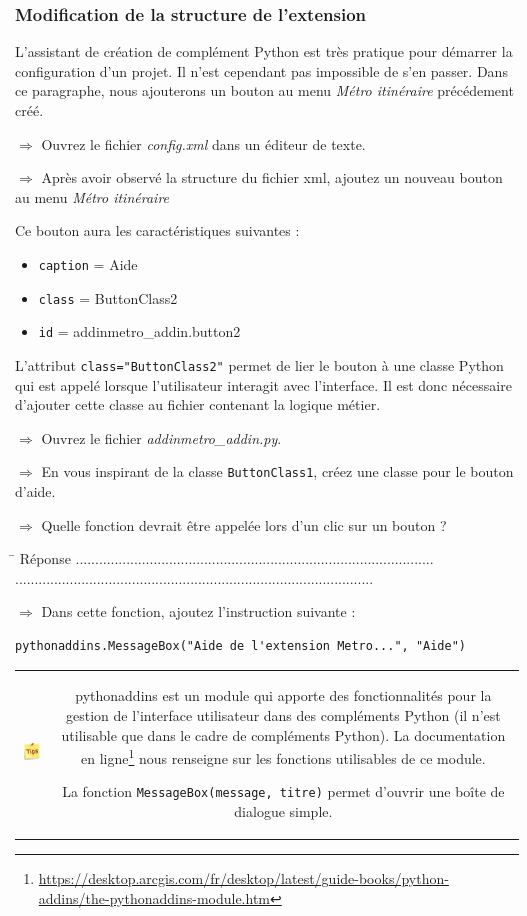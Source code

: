\documentclass[11pt]{article}
\newcommand{\action}{$\Rightarrow$ }
\newcommand{\reponse}{
	\begin{tabbing}
	\hspace{2cm}\=\kill
	Réponse \> ............................................................................................ \\
 	\> ............................................................................................
	\end{tabbing}
}
\newenvironment{note}{%
	\begin{tabular}[t t]{c c}
		\includegraphics{img/tips.png}
		 &
		\begin{minipage}[c]{0.9\linewidth}
			\begin{sffamily}
}{%
			\end{sffamily}
		\end{minipage}
	\end{tabular}
}
\newcommand{\code}[1]{\lstinline{#1}}
\begin{document}
\subsubsection{Modification de la structure de l'extension}
L'assistant de création de complément Python est très pratique pour démarrer la configuration d'un projet. Il n'est cependant pas impossible de s'en passer. Dans ce paragraphe, nous ajouterons un bouton au menu \textit{Métro itinéraire} précédement créé.

\action Ouvrez le fichier \textit{config.xml} dans un éditeur de texte.

\action Après avoir observé la structure du fichier xml, ajoutez un nouveau bouton au menu \textit{Métro itinéraire}

Ce bouton aura les caractéristiques suivantes :
\begin{itemize}
	\item \code{caption} = Aide
	\item \code{class} = ButtonClass2
	\item \code{id} = addinmetro\_addin.button2
\end{itemize}

L'attribut \code{class="ButtonClass2"} permet de lier le bouton à une classe Python qui est appelé lorsque l'utilisateur interagit avec l'interface. Il est donc nécessaire d'ajouter cette classe au fichier contenant la logique métier.

\action Ouvrez le fichier \textit{addinmetro\_addin.py}.

\action En vous inspirant de la classe \code{ButtonClass1}, créez une classe pour le bouton d'aide.

\action Quelle fonction devrait être appelée lors d'un clic sur un bouton ?

\reponse

\action Dans cette fonction, ajoutez l'instruction suivante :
\begin{lstlisting}
pythonaddins.MessageBox("Aide de l'extension Metro...", "Aide")
\end{lstlisting}

\begin{note}
pythonaddins est un module qui apporte des fonctionnalités pour la gestion de l'interface utilisateur dans des compléments Python (il n'est utilisable que dans le cadre de compléments Python). La documentation en ligne\footnote{\url{https://desktop.arcgis.com/fr/desktop/latest/guide-books/python-addins/the-pythonaddins-module.htm}} nous renseigne sur les fonctions utilisables de ce module.

La fonction \code{MessageBox(message, titre)} permet d'ouvrir une boîte de dialogue simple.
\end{note}
\end{document}
